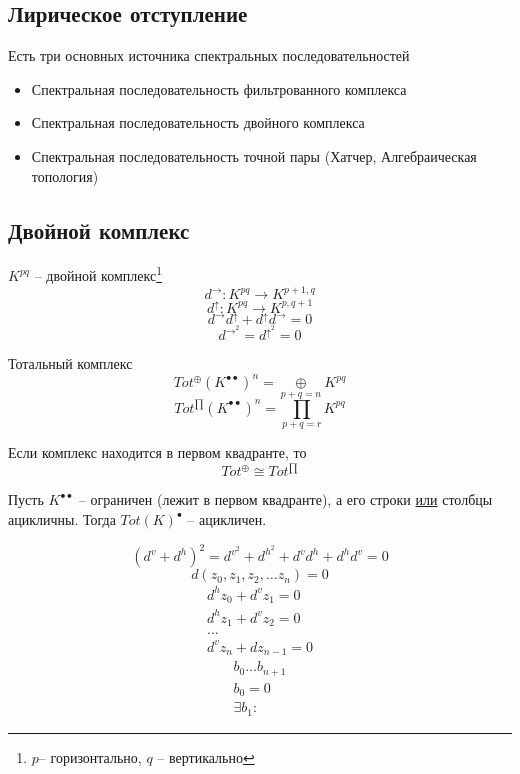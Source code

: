 \documentclass[../main.tex]{subfiles}
\begin{document}
\subsection{Лирическое отступление}
Есть три основных источника спектральных последовательностей 
\begin{itemize}
    \item Спектральная последовательность фильтрованного комплекса
    \item Спектральная последовательность двойного комплекса
    \item Спектральная последовательность точной пары (Хатчер, Алгебраическая топология)
\end{itemize}
\subsection{Двойной комплекс}
\begin{to_def}
$K^{pq}$ -- двойной комплекс\footnote{$p$-- горизонтально, $q$ -- вертикально}
\[d^{\rightarrow}\colon K^{pq}\to K^{p+1, q}\]
\[d^{\uparrow}\colon K^{pq}\to K^{p, q+1}\]
\[d^{\rightarrow}d^{\uparrow} + d^{\uparrow}d^{\rightarrow} = 0\]
\[d^{\rightarrow}^2 = d^{\uparrow}^2 = 0\]
\end{to_def}
\begin{to_def}
Тотальный комплекс
\[Tot^{\oplus}(K^{\bullet\bullet})^n = \underset{p+q=n}{\oplus}K^{pq}\]
\[Tot^{\prod}(K^{\bullet\bullet})^n = \underset{p+q=r}{\prod}K^{pq}\]
\end{to_def}
\begin{to_claim}
Если комплекс находится в первом квадранте, то 
\[Tot^{\oplus} \cong Tot^{\prod}\]
\end{to_claim}
\begin{to_claim}
Пусть $K^{\bullet\bullet}$ -- ограничен (лежит в первом квадранте), а его строки \underline{или} столбцы ацикличны. Тогда $Tot(K)^\bullet$ -- ацикличен.
\end{to_claim}
\[(d^v + d^h)^2 = d^v^2 + d^h^2 + d^v d^h + d^h d^v = 0 \]
\[
d(z_0, z_1, z_2, \ldots z_n) = 0
\]
\begin{align*}
    d^h z_0 + d^v z_1 = 0\\
    d^h z_1 + d^v z_2 = 0\\
    \ldots\\
    d^v z_n + dz_{n-1} = 0
\end{align*}
\begin{align*}
    b_0 \ldots b_{n+1}\\
    b_0 = 0\\
    \exists b_1\colon
\end{align*}
\bee
{}
\eee
\end{document}
